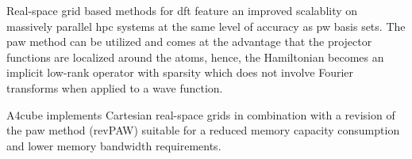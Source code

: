 \documentclass[oribibl]{llncs}
\newcommand{\codename}{A4cube}
\begin{document}
Real-space grid based methods for \ac{dft}
feature an improved scalablity on massively parallel \ac{hpc} systems at the same level of accuracy as \ac{pw} basis sets. 
The \ac{paw} method can be utilized and comes at the advantage that the projector functions are localized around the atoms, 
hence, the Hamiltonian becomes an implicit low-rank operator with sparsity which does not involve Fourier transforms when applied to a wave function.


\codename{} implements Cartesian real-space grids 
in combination with a revision of the \ac{paw} method (revPAW) suitable for
a reduced memory capacity consumption and lower memory bandwidth requirements.


 
\end{document}
